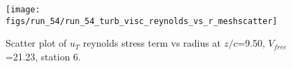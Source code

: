 \begin{figure}[H]
\centering
\texttt{[image: figs/run\_54/run\_54\_turb\_visc\_reynolds\_vs\_r\_meshscatter]}
\caption{Scatter plot of $
u_T$ reynolds stress term vs radius at $z/c$=9.50, $V_{free}$=21.23, station 6.}
\label{fig:run_54_turb_visc_reynolds_vs_r_meshscatter}
\end{figure}


